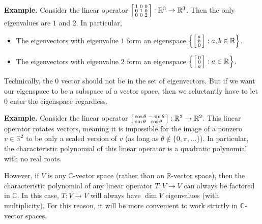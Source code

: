 \textbf{Example.} Consider the linear operator $\begin{bsmallmatrix} 1 & 0 & 0 \\ 0 & 1 & 0 \\ 0 & 0 & 2 \end{bsmallmatrix}: \mathbb{R}^3 \to \mathbb{R}^3$.  Then the only eigenvalues are $1$ and $2$.  In particular,
\begin{itemize}
    \item The eigenvectors with eigenvalue $1$ form an eigenspace $\left\{\begin{bsmallmatrix} a \\ b \\ 0 \end{bsmallmatrix}: a, b \in \mathbb{R} \right\}$.
    \item The eigenvectors with eigenvalue $2$ form an eigenspace $\left\{\begin{bsmallmatrix} 0 \\ 0 \\ a \end{bsmallmatrix}: a \in \mathbb{R}\right\}$.
\end{itemize}

\begin{remark}
    Technically, the $0$ vector should not be in the set of eigenvectors.  But if we want our eigenspace to be a subspace of a vector space, then we reluctantly have to let $0$ enter the eigenspace regardless.
\end{remark}

\textbf{Example.} Consider the linear operator $\begin{bsmallmatrix} \cos \theta & - \sin \theta \\ \sin \theta & \cos \theta \end{bsmallmatrix}: \mathbb{R}^2 \to \mathbb{R}^2$.  This linear operator rotates vectors, meaning it is impossible for the image of a nonzero $v \in \mathbb{R}^2$ to be only a scaled version of $v$ (as long as $\theta \not \in \{0, \pi, \dots\}$).  In particular, the characteristic polynomial of this linear operator is a quadratic polynomial with no real roots. 

However, if $V$ is any $\mathbb{C}$-vector space (rather than an $\mathbb{R}$-vector space), then the characteristic polynomial of any linear operator $T: V \to V$ can always be factored in $\mathbb{C}$.  In this case, $T: V \to V$ will always have $\dim V$ eigenvalues (with multiplicity).  For this reason, it will be more convenient to work strictly in $\mathbb{C}$-vector spaces.

